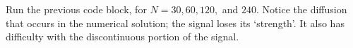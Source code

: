 \begin{problem}
Run the previous code block, for $N = 30, 60, 120, $ and $240$.
Notice the diffusion that occurs in the numerical solution; the signal loses its `strength'.
It also has difficulty with the discontinuous portion of the signal.
\end{problem}

